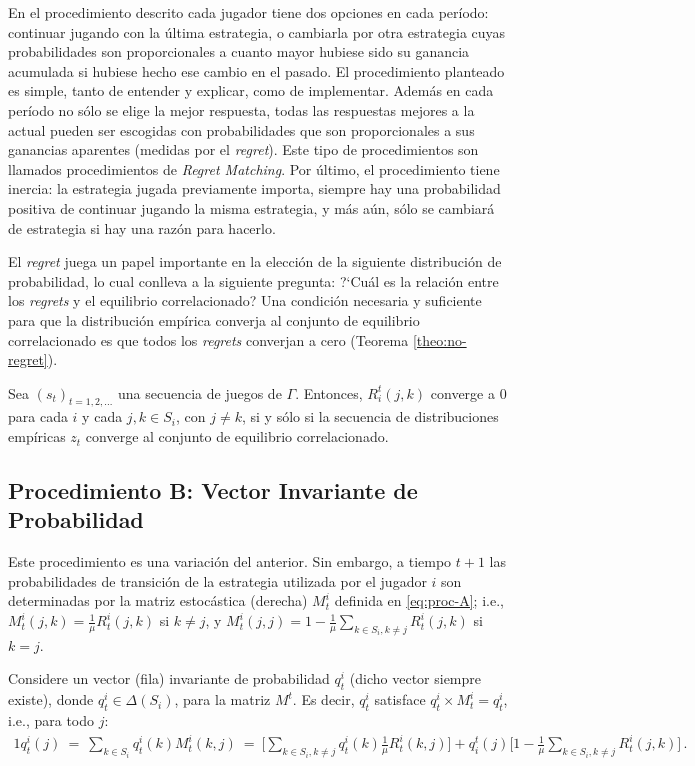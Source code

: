 En el procedimiento descrito cada jugador tiene dos opciones en cada período: continuar jugando con la última estrategia, o cambiarla por otra estrategia cuyas probabilidades son proporcionales a cuanto mayor hubiese sido su ganancia acumulada si hubiese hecho ese cambio en el pasado. El procedimiento planteado es simple, tanto de entender y explicar, como de implementar. Además en cada período no sólo se elige la mejor respuesta, todas las respuestas mejores a la actual pueden ser escogidas con probabilidades que son proporcionales a sus ganancias aparentes (medidas por el \textit{regret}). Este tipo de procedimientos son llamados procedimientos de \textit{Regret Matching}. Por último, el procedimiento tiene inercia: la estrategia jugada previamente importa, siempre hay una probabilidad positiva de continuar jugando la misma estrategia, y más aún, sólo se cambiará de estrategia si hay una razón para hacerlo.

El \textit{regret} juega un papel importante en la elección de la siguiente distribución de probabilidad, lo cual conlleva a la siguiente pregunta: ?`Cuál es la relación entre los \textit{regrets} y el equilibrio correlacionado? Una condición necesaria y suficiente para que la distribución empírica converja al conjunto de equilibrio correlacionado es que todos los \textit{regrets} converjan a cero (Teorema \ref{theo:no-regret}).

\begin{theorem}
\label{theo:no-regret}
Sea $(s_t)_{t = 1, 2, ...}$ una secuencia de juegos de $\Gamma$.
Entonces, $R_i^t(j, k)$ converge a $0$ para cada $i$ y cada $j, k \in S_i$, con $j \neq k$, si y sólo si la secuencia de distribuciones empíricas $z_t$ converge al conjunto de equilibrio correlacionado.
\end{theorem}

\subsection*{Procedimiento B: Vector Invariante de Probabilidad}

Este procedimiento es una variación del anterior. Sin embargo, a tiempo $t+1$ las probabilidades de transición de la estrategia utilizada por el jugador $i$ son determinadas por la matriz estocástica (derecha) $M^i_t$ definida en \eqref{eq:proc-A}; i.e., $M^i_t(j,k)=\frac{1}{\mu}R^i_t(j,k)$ si $k\neq j$, y $M^i_t(j,j)=1-\frac{1}{\mu}\sum_{k\in S_i,k\neq j} R^i_t(j,k)$ si $k=j$.

Considere un vector (fila) invariante de probabilidad $q^i_t$ (dicho vector siempre existe), donde $q^i_t\in \Delta(S_i)$, para la matriz $M^t$. Es decir, $q^i_t$ satisface $q^i_t \times M^i_t = q^i_t$, i.e., para todo $j$:
\begin{alignat}{1}
\label{eq:def-inv-vector}
  q^i_t(j)\ 
    =\ \sum_{k\in S_i} q^i_t(k) M^i_t(k,j)\ 
    =\ \bigg[\sum_{k \in S_i, k \neq j} q^i_t(k)\frac{1}{\mu}R^i_t(k,j)\bigg] + q_i^t(j)\biggl[1 - \frac{1}{\mu}\sum_{k \in S_i, k \neq j} R^i_t(j,k)\biggr]\,.
\end{alignat}

